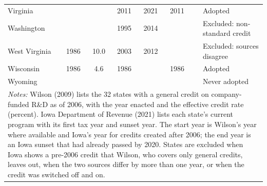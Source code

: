 \begin{longtable}{lccccccl}
Virginia &  &  & 2011 & 2021 & 2011 &  & Adopted \\
Washington &  &  & 1995 & 2014 &  &  & Excluded: non-standard credit \\
West Virginia & 1986 & 10.0 & 2003 & 2012 &  &  & Excluded: sources disagree \\
Wisconsin & 1986 & 4.6 & 1986 &  & 1986 &  & Adopted \\
Wyoming &  &  &  &  &  &  & Never adopted \\
\bottomrule
\multicolumn{8}{p{0.95\textwidth}}{\footnotesize \textit{Notes:} Wilson (2009) lists the 32 states with a
general credit on company-funded R\&D as of 2006, with the year enacted and the effective credit rate
(percent). Iowa Department of Revenue (2021) lists each state's current program with its first tax year and
sunset year. The start year is Wilson's year where available and Iowa's year for credits created after
2006; the end year is an Iowa sunset that had already passed by 2020. States are excluded when Iowa
shows a pre-2006 credit that Wilson, who covers only general credits, leaves out,
when the two sources differ by more than one year, or when the credit was switched off and on.}\\
\end{longtable}
